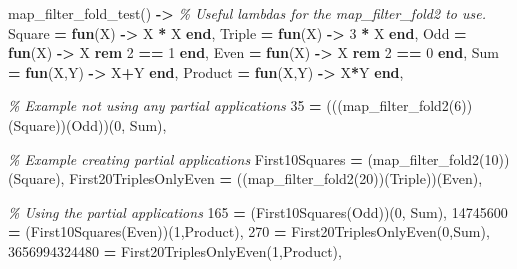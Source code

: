 \documentclass[
]{book}
\newenvironment{Shaded}{\begin{snugshade}}{\end{snugshade}}
\newcommand{\CommentTok}[1]{\textcolor[rgb]{0.56,0.35,0.01}{\textit{#1}}}
\newcommand{\DecValTok}[1]{\textcolor[rgb]{0.00,0.00,0.81}{#1}}
\newcommand{\FunctionTok}[1]{\textcolor[rgb]{0.00,0.00,0.00}{#1}}
\newcommand{\KeywordTok}[1]{\textcolor[rgb]{0.13,0.29,0.53}{\textbf{#1}}}
\newcommand{\OperatorTok}[1]{\textcolor[rgb]{0.81,0.36,0.00}{\textbf{#1}}}
\newcommand{\VariableTok}[1]{\textcolor[rgb]{0.00,0.00,0.00}{#1}}
\begin{document}
\begin{Shaded}
\begin{Highlighting}[]
\FunctionTok{map\_filter\_fold\_test()} \OperatorTok{{-}\textgreater{}}
    \CommentTok{\% Useful lambdas for the map\_filter\_fold2 to use.}
    \VariableTok{Square} \OperatorTok{=} \KeywordTok{fun}\FunctionTok{(}\VariableTok{X}\FunctionTok{)} \OperatorTok{{-}\textgreater{}} \VariableTok{X} \OperatorTok{*} \VariableTok{X} \KeywordTok{end}\FunctionTok{,}
    \VariableTok{Triple} \OperatorTok{=} \KeywordTok{fun}\FunctionTok{(}\VariableTok{X}\FunctionTok{)} \OperatorTok{{-}\textgreater{}} \DecValTok{3} \OperatorTok{*} \VariableTok{X} \KeywordTok{end}\FunctionTok{,}
    \VariableTok{Odd} \OperatorTok{=} \KeywordTok{fun}\FunctionTok{(}\VariableTok{X}\FunctionTok{)} \OperatorTok{{-}\textgreater{}} \VariableTok{X} \OperatorTok{rem} \DecValTok{2} \OperatorTok{==} \DecValTok{1} \KeywordTok{end}\FunctionTok{,}
    \VariableTok{Even} \OperatorTok{=} \KeywordTok{fun}\FunctionTok{(}\VariableTok{X}\FunctionTok{)} \OperatorTok{{-}\textgreater{}} \VariableTok{X} \OperatorTok{rem} \DecValTok{2} \OperatorTok{==} \DecValTok{0} \KeywordTok{end}\FunctionTok{,}
    \VariableTok{Sum} \OperatorTok{=} \KeywordTok{fun}\FunctionTok{(}\VariableTok{X}\FunctionTok{,}\VariableTok{Y}\FunctionTok{)} \OperatorTok{{-}\textgreater{}} \VariableTok{X}\OperatorTok{+}\VariableTok{Y} \KeywordTok{end}\FunctionTok{,}
    \VariableTok{Product} \OperatorTok{=} \KeywordTok{fun}\FunctionTok{(}\VariableTok{X}\FunctionTok{,}\VariableTok{Y}\FunctionTok{)} \OperatorTok{{-}\textgreater{}} \VariableTok{X}\OperatorTok{*}\VariableTok{Y} \KeywordTok{end}\FunctionTok{,}

    \CommentTok{\% Example not using any partial applications    }
    \DecValTok{35} \OperatorTok{=} \FunctionTok{(((map\_filter\_fold2(}\DecValTok{6}\FunctionTok{))(}\VariableTok{Square}\FunctionTok{))(}\VariableTok{Odd}\FunctionTok{))(}\DecValTok{0}\FunctionTok{,} \VariableTok{Sum}\FunctionTok{),}
    
    \CommentTok{\% Example creating partial applications}
    \VariableTok{First10Squares} \OperatorTok{=} \FunctionTok{(map\_filter\_fold2(}\DecValTok{10}\FunctionTok{))(}\VariableTok{Square}\FunctionTok{),}
    \VariableTok{First20TriplesOnlyEven} \OperatorTok{=} \FunctionTok{((map\_filter\_fold2(}\DecValTok{20}\FunctionTok{))(}\VariableTok{Triple}\FunctionTok{))(}\VariableTok{Even}\FunctionTok{),}

    \CommentTok{\% Using the partial applications}
    \DecValTok{165} \OperatorTok{=} \FunctionTok{(}\VariableTok{First10Squares}\FunctionTok{(}\VariableTok{Odd}\FunctionTok{))(}\DecValTok{0}\FunctionTok{,} \VariableTok{Sum}\FunctionTok{),}
    \DecValTok{14745600} \OperatorTok{=} \FunctionTok{(}\VariableTok{First10Squares}\FunctionTok{(}\VariableTok{Even}\FunctionTok{))(}\DecValTok{1}\FunctionTok{,}\VariableTok{Product}\FunctionTok{),}
    \DecValTok{270} \OperatorTok{=} \VariableTok{First20TriplesOnlyEven}\FunctionTok{(}\DecValTok{0}\FunctionTok{,}\VariableTok{Sum}\FunctionTok{),}
    \DecValTok{3656994324480} \OperatorTok{=} \VariableTok{First20TriplesOnlyEven}\FunctionTok{(}\DecValTok{1}\FunctionTok{,}\VariableTok{Product}\FunctionTok{),}


\end{Highlighting}
\end{Shaded}
\end{document}
